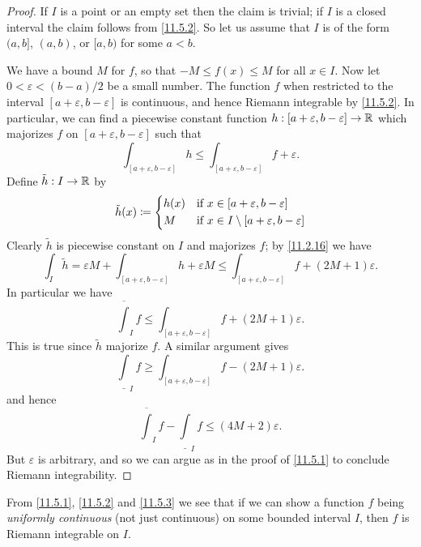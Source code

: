 \begin{proof}
  If \(I\) is a point or an empty set then the claim is trivial;
  if \(I\) is a closed interval the claim follows from \cref{11.5.2}.
  So let us assume that \(I\) is of the form \((a, b]\), \((a, b)\), or \([a, b)\) for some \(a < b\).

  We have a bound \(M\) for \(f\), so that \(-M \leq f(x) \leq M\) for all \(x \in I\).
  Now let \(0 < \varepsilon < (b - a) / 2\) be a small number.
  The function \(f\) when restricted to the interval \([a + \varepsilon, b - \varepsilon]\) is continuous, and hence Riemann integrable by \cref{11.5.2}.
  In particular, we can find a piecewise constant function \(h : [a + \varepsilon, b - \varepsilon] \to \mathbb{R}\) which majorizes \(f\) on \([a + \varepsilon, b - \varepsilon]\) such that
  \[
    \int_{[a + \varepsilon, b - \varepsilon]} h \leq \int_{[a + \varepsilon, b - \varepsilon]} f + \varepsilon.
  \]
  Define \(\tilde{h} : I \to \mathbb{R}\) by
  \[
    \tilde{h}(x) \coloneqq \begin{dcases}
      h(x) & \text{if } x \in [a + \varepsilon, b - \varepsilon]             \\
      M    & \text{if } x \in I \setminus [a + \varepsilon, b - \varepsilon]
    \end{dcases}
  \]
  Clearly \(\tilde{h}\) is piecewise constant on \(I\) and majorizes \(f\);
  by \cref{11.2.16} we have
  \[
    \int_I \tilde{h} = \varepsilon M + \int_{[a + \varepsilon, b - \varepsilon]} h + \varepsilon M \leq \int_{[a + \varepsilon, b - \varepsilon]} f + (2M + 1) \varepsilon.
  \]
  In particular we have
  \[
    \overline{\int}_I f \leq \int_{[a + \varepsilon, b - \varepsilon]} f + (2M + 1) \varepsilon.
  \]
  This is true since \(\tilde{h}\) majorize \(f\).
  A similar argument gives
  \[
    \underline{\int}_I f \geq \int_{[a + \varepsilon, b - \varepsilon]} f - (2M + 1) \varepsilon.
  \]
  and hence
  \[
    \overline{\int}_I f - \underline{\int}_I f \leq (4M + 2) \varepsilon.
  \]
  But \(\varepsilon\) is arbitrary, and so we can argue as in the proof of \cref{11.5.1} to conclude Riemann integrability.
\end{proof}

\begin{note}
  From \cref{11.5.1}, \cref{11.5.2} and \cref{11.5.3} we see that if we can show a function \(f\) being \emph{uniformly continuous} (not just continuous) on some bounded interval \(I\), then \(f\) is Riemann integrable on \(I\).
\end{note}

